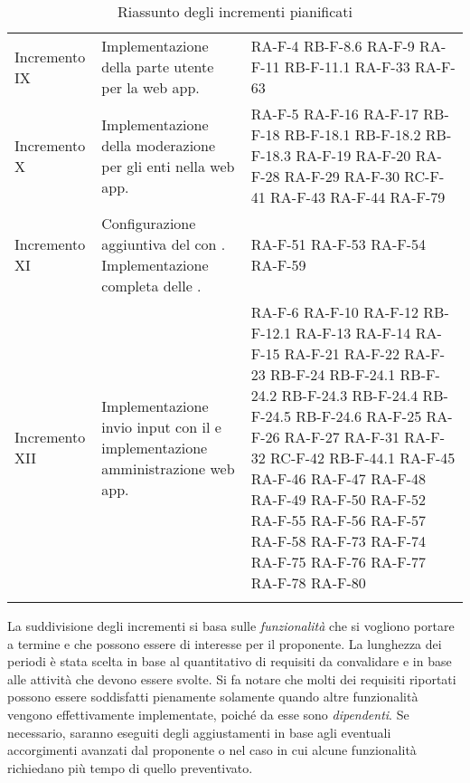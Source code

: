 \begin{center}
\begin{longtable}{|p{2.5cm}|p{6.5cm}|p{6cm}|}
	\hline
	\rowcolor{lighter-grayer} \multicolumn{3}{|c|}{\textbf{Completamento dell'implementazione e raffinamento delle funzionalità}} \\ \hline 
	Incremento IX	& Implementazione della parte utente per la web app. & RA-F-4 RB-F-8.6 RA-F-9 RA-F-11 RB-F-11.1 RA-F-33 RA-F-63 \\	\hline
	Incremento X	& Implementazione della moderazione per gli enti nella web app. & RA-F-5 RA-F-16 RA-F-17 RB-F-18 RB-F-18.1 RB-F-18.2 RB-F-18.3 RA-F-19 RA-F-20 RA-F-28 RA-F-29 RA-F-30  RC-F-41 RA-F-43 RA-F-44  RA-F-79 \\	\hline
	Incremento XI   & Configurazione aggiuntiva del \glock{gateway} con \glock{Kafka}. Implementazione completa delle \glock{API}. & RA-F-51 RA-F-53 RA-F-54 RA-F-59 \\ \hline
	Incremento XII	& Implementazione invio input con il \glock{bot Telegram} e implementazione amministrazione web app. & RA-F-6 RA-F-10 RA-F-12 RB-F-12.1 RA-F-13 RA-F-14 RA-F-15 RA-F-21 RA-F-22 RA-F-23 RB-F-24 RB-F-24.1 RB-F-24.2 RB-F-24.3 RB-F-24.4 RB-F-24.5 RB-F-24.6 RA-F-25 RA-F-26 RA-F-27 RA-F-31 RA-F-32 RC-F-42 RB-F-44.1 RA-F-45 RA-F-46 RA-F-47 RA-F-48 RA-F-49 RA-F-50 RA-F-52 RA-F-55 RA-F-56 RA-F-57 RA-F-58 RA-F-73 RA-F-74 RA-F-75 RA-F-76 RA-F-77 RA-F-78 RA-F-80 \\	\hline

	\caption{Riassunto degli incrementi pianificati}
	\end{longtable}
\end{center}
La suddivisione degli incrementi si basa sulle \textit{funzionalità} che si vogliono portare a termine e che possono essere di interesse per il proponente. La lunghezza dei periodi è stata scelta in base al quantitativo di requisiti da convalidare e in base alle attività che devono essere svolte. Si fa notare che molti dei requisiti riportati possono essere soddisfatti pienamente solamente quando altre funzionalità vengono effettivamente implementate, poiché da esse sono \textit{dipendenti}. 
\newline 
Se necessario, saranno eseguiti degli aggiustamenti in base agli eventuali accorgimenti avanzati dal proponente o nel caso in cui alcune funzionalità richiedano più tempo di quello preventivato.
